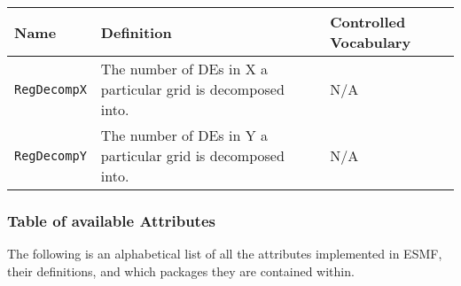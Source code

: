 \begin{longtable}{|p{5cm}|p{5cm}|p{35mm}|}
\hline\hline
{\bf Name} & {\bf Definition} & {\bf Controlled Vocabulary} \\
\hline\hline
{\tt RegDecompX} & The number of DEs in X a particular grid is decomposed into.& N/A\\
{\tt RegDecompY} & The number of DEs in Y a particular grid is decomposed into.& N/A\\
\hline\hline
\end{longtable}

\vspace{.20in}

\subsubsection{Table of available Attributes}

The following is an alphabetical list of all the attributes implemented in ESMF, their definitions, and which packages they are contained within. 

\noindent

